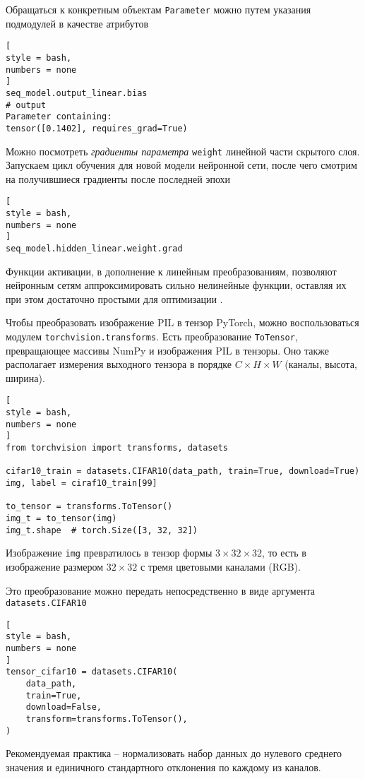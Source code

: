 \documentclass[%
	11pt,
	a4paper,
	utf8,
		]{article}
\begin{document}
Обращаться к конкретным объектам \verb|Parameter| можно путем указания подмодулей в качестве атрибутов
\begin{lstlisting}[
style = bash,
numbers = none	
]
seq_model.output_linear.bias
# output
Parameter containing:
tensor([0.1402], requires_grad=True)
\end{lstlisting}

Можно посмотреть \emph{градиенты параметра} \verb|weight| линейной части скрытого слоя. Запускаем цикл обучения для новой модели нейронной сети, после чего смотрим на получившиеся градиенты после последней эпохи
\begin{lstlisting}[
style = bash,
numbers = none
]
seq_model.hidden_linear.weight.grad
\end{lstlisting}

Функции активации, в дополнение к линейным преобразованиям, позволяют нейронным сетям аппроксимировать сильно нелинейные функции, оставляя их при этом достаточно простыми для оптимизации \cite[]{pytorch-2022}.

Чтобы преобразовать изображение PIL в тензор PyTorch, можно воспользоваться модулем \verb|torchvision.transforms|. Есть преобразование \verb|ToTensor|, превращающее массивы NumPy и изображения PIL в тензоры. Оно также располагает измерения выходного тензора в порядке $C \times H \times W$ (каналы, высота, ширина).
\begin{lstlisting}[
style = bash,
numbers = none
]
from torchvision import transforms, datasets

cifar10_train = datasets.CIFAR10(data_path, train=True, download=True)
img, label = ciraf10_train[99]

to_tensor = transforms.ToTensor()
img_t = to_tensor(img)
img_t.shape  # torch.Size([3, 32, 32])
\end{lstlisting}

Изображение \verb|img| превратилось в тензор формы $3 \times 32 \times 32$, то есть в изображение размером $32 \times 32$ с тремя цветовыми каналами (RGB).

Это преобразование можно передать непосредственно в виде аргумента \verb|datasets.CIFAR10|
\begin{lstlisting}[
style = bash,
numbers = none
]
tensor_cifar10 = datasets.CIFAR10(
    data_path,
    train=True,
    download=False,
    transform=transforms.ToTensor(),
)
\end{lstlisting}

Рекомендуемая практика -- нормализовать набор данных до нулевого среднего значения и единичного стандартного отклонения по каждому из каналов. 
\end{document}
